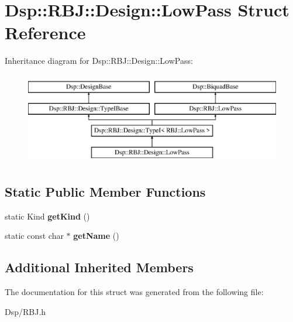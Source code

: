 \hypertarget{structDsp_1_1RBJ_1_1Design_1_1LowPass}{\section{Dsp\-:\-:R\-B\-J\-:\-:Design\-:\-:Low\-Pass Struct Reference}
\label{structDsp_1_1RBJ_1_1Design_1_1LowPass}
}
Inheritance diagram for Dsp\-:\-:R\-B\-J\-:\-:Design\-:\-:Low\-Pass\-:\begin{figure}[H]
\begin{center}
\leavevmode
\includegraphics[height=4.000000cm]{structDsp_1_1RBJ_1_1Design_1_1LowPass}
\end{center}
\end{figure}
\subsection*{Static Public Member Functions}
\begin{DoxyCompactItemize}
\item 
\hypertarget{structDsp_1_1RBJ_1_1Design_1_1LowPass_aa62e23a288079295350238ec03f648c0}{static Kind {\bfseries get\-Kind} ()}\label{structDsp_1_1RBJ_1_1Design_1_1LowPass_aa62e23a288079295350238ec03f648c0}

\item 
\hypertarget{structDsp_1_1RBJ_1_1Design_1_1LowPass_a80b21693ab5de2b93e212a52663f9a72}{static const char $\ast$ {\bfseries get\-Name} ()}\label{structDsp_1_1RBJ_1_1Design_1_1LowPass_a80b21693ab5de2b93e212a52663f9a72}

\end{DoxyCompactItemize}
\subsection*{Additional Inherited Members}


The documentation for this struct was generated from the following file\-:\begin{DoxyCompactItemize}
\item 
Dsp/R\-B\-J.\-h\end{DoxyCompactItemize}
